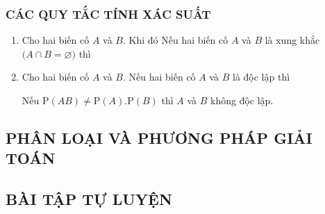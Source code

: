 \subsubsection{CÁC QUY TẮC TÍNH XÁC SUẤT}
\begin{enumerate}[\iconMT]
	\item {} Cho hai biến cố $A$ và $B$. Khi đó 
	Nếu hai biến cố $A$ và $B$ là xung khắc $\big(A \cap B = \varnothing\big)$ thì 
	\item {} Cho hai biến cố $A$ và $B$.
	Nếu hai biến cố $A$ và $B$ là độc lập thì 
	\begin{luuy}
		Nếu $\mathrm{P}(A B)\ne \mathrm{P}(A) . \mathrm{P}(B)$ thì $A$ và $B$ không độc lập.
	\end{luuy}
\end{enumerate}

\subsection{PHÂN LOẠI VÀ PHƯƠNG PHÁP GIẢI TOÁN}

\subsection{BÀI TẬP TỰ LUYỆN}


